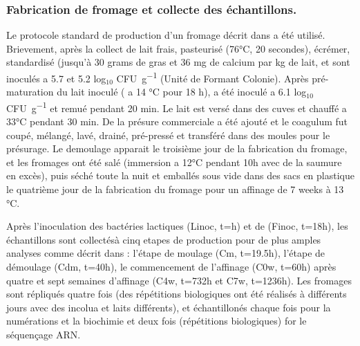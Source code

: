 \documentclass[../main.tex]{subfiles}
\begin{document}
\subsubsection{Fabrication de fromage et collecte des échantillons.} Le protocole standard de production d'un fromage décrit dans \citep{Cao2021} a été utilisé. Brievement, après la collect de lait frais, pasteurisé (\num{76}\unit{\degreeCelsius}, \num{20} \unit{secondes}), écrémer, standardisé (jusqu'à 30 grams de gras et 36 \unit{mg} de calcium par \unit{kg} de lait, \lactis et \plantarum sont inoculés a 5.7 et 5.2 log$_{10}$ \unit{CFU\per\gram} (Unité de Formant Colonie). Après pré-maturation du lait inoculé ( a \num{14} \unit{\degreeCelsius} pour \num{18} \unit{h}), \freud a été inoculé a 6.1 log$_{10}$ \unit{CFU\per\gram} et remué pendant \unit{20} \unit{min}. Le lait est versé dans des cuves et chauffé a \num{33}\unit{\degreeCelsius} pendant \num{30} \unit{min}. De la présure commerciale a été ajouté et le coagulum fut coupé, mélangé, lavé, drainé, pré-pressé et transféré dans des moules pour le présurage. Le demoulage apparait le troisième jour de la fabrication du fromage, et les fromages ont été salé (immersion a \num{12}\unit{\degreeCelsius} pendant \num{10}\unit{h} avec de la saumure en excès), puis séché toute la nuit et emballés sous vide dans des sacs en plastique le quatrième jour de la fabrication du fromage pour un affinage de  \num{7} \unit{weeks} à \num{13} \unit{\degreeCelsius}.

Après l'inoculation des bactéries lactiques (Linoc, t=\unit{h}) et de \freud (Finoc, t=18\unit{h}), les échantillons sont collectésà cinq etapes de production pour de plus amples analyses comme décrit dans \citep{Cao2021}: l'étape de moulage (Cm, t=19.5\unit{h}), l'étape de démoulage (Cdm, t=40\unit{h}), le commencement de l'affinage (C0w, t=60\unit{h}) après quatre et sept semaines d'affinage (C4w, t=732\unit{h} et C7w, t=1236\unit{h}). Les fromages sont répliqués quatre fois (des répétitions biologiques ont été réalisés à différents jours avec des incolua et laits différents), et échantillonés chaque fois pour la numérations et la biochimie et deux fois (répétitions biologiques) for le séquençage ARN.
\end{document}
